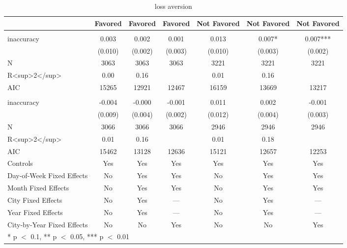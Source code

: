 \begin{table}
\centering
\caption{loss aversion}
\centering
\begin{tabular}[t]{lcccccc}
\toprule
  & Favored & Favored  & Favored   & Not Favored & Not Favored  & Not Favored  \\
\midrule
\addlinespace[0.5em]
\multicolumn{7}{l}{\textit{Panel A: Losses}}\\
\midrule \hspace{1em}inaccuracy & 0.003 & 0.002 & 0.001 & 0.013 & 0.007* & 0.007***\\
\hspace{1em} & (0.010) & (0.002) & (0.003) & (0.010) & (0.003) & (0.002)\\
\hspace{1em}N & 3063 & 3063 & 3063 & 3221 & 3221 & 3221\\
\hspace{1em}R<sup>2</sup> & 0.00 & 0.16 &  & 0.01 & 0.16 & \\
\hspace{1em}AIC & 15265 & 12921 & 12467 & 16159 & 13669 & 13217\\
\addlinespace[0.5em]
\multicolumn{7}{l}{\textit{Panel B: Wins}}\\
\midrule \hspace{1em}inaccuracy & -0.004 & -0.000 & -0.001 & 0.011 & 0.002 & -0.001\\
\hspace{1em} & (0.009) & (0.004) & (0.002) & (0.012) & (0.004) & (0.003)\\
\hspace{1em}N & 3066 & 3066 & 3066 & 2946 & 2946 & 2946\\
\hspace{1em}R<sup>2</sup> & 0.01 & 0.16 &  & 0.01 & 0.18 & \\
\hspace{1em}AIC & 15462 & 13128 & 12636 & 15121 & 12657 & 12253\\
Controls & Yes & Yes & Yes & Yes & Yes & Yes\\
Day-of-Week Fixed Effects & No & Yes & Yes & No & Yes & Yes\\
Month Fixed Effects & No & Yes & Yes & No & Yes & Yes\\
City Fixed Effects & No & Yes & — & No & Yes & —\\
Year Fixed Effects & No & Yes & — & No & Yes & —\\
City-by-Year Fixed Effects & No & No & Yes & No & No & Yes\\
\bottomrule
\multicolumn{7}{l}{\rule{0pt}{1em}* p $<$ 0.1, ** p $<$ 0.05, *** p $<$ 0.01}\\
\end{tabular}
\end{table}
